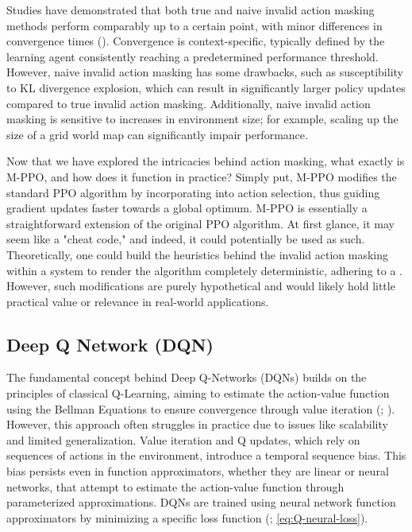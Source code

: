 \noindent Studies have demonstrated that both true and naive invalid action masking methods perform comparably up to a certain point, with minor differences in convergence times (\textcolor{deepblue}{\cite{Huang_2022}}). Convergence is context-specific, typically defined by the learning agent consistently reaching a predetermined performance threshold. However, naive invalid action masking has some drawbacks, such as susceptibility to KL divergence explosion, which can result in significantly larger policy updates compared to true invalid action masking. Additionally, naive invalid action masking is sensitive to increases in environment size; for example, scaling up the size of a grid world map can significantly impair performance.

\bigskip

\noindent Now that we have explored the intricacies behind action masking, what exactly is M-PPO, and how does it function in practice? Simply put, M-PPO modifies the standard PPO algorithm by incorporating  into action selection, thus guiding gradient updates faster towards a global optimum. M-PPO is essentially a straightforward extension of the original PPO algorithm. At first glance, it may seem like a "cheat code," and indeed, it could potentially be used as such. Theoretically, one could build the heuristics behind the invalid action masking within a system to render the algorithm completely deterministic, adhering to a . However, such modifications are purely hypothetical and would likely hold little practical value or relevance in real-world applications.


\subsection{Deep Q Network (DQN)}
\label{sec:dqn}

\noindent The fundamental concept behind Deep Q-Networks (DQNs) builds on the principles of classical Q-Learning, aiming to estimate the action-value function using the Bellman Equations to ensure convergence through value iteration (\textcolor{deepblue}{\cite{mnih2013playing}; \cite{stable-baselines3}}). However, this approach often struggles in practice due to issues like scalability and limited generalization. Value iteration and Q updates, which rely on sequences of actions in the environment, introduce a temporal sequence bias. This bias persists even in function approximators, whether they are linear or neural networks, that attempt to estimate the action-value function through parameterized approximations. DQNs are trained using neural network function approximators by minimizing a specific loss function (\textcolor{deepblue}{\cite{mnih2013playing}; \autoref{eq:Q-neural-loss}}).

